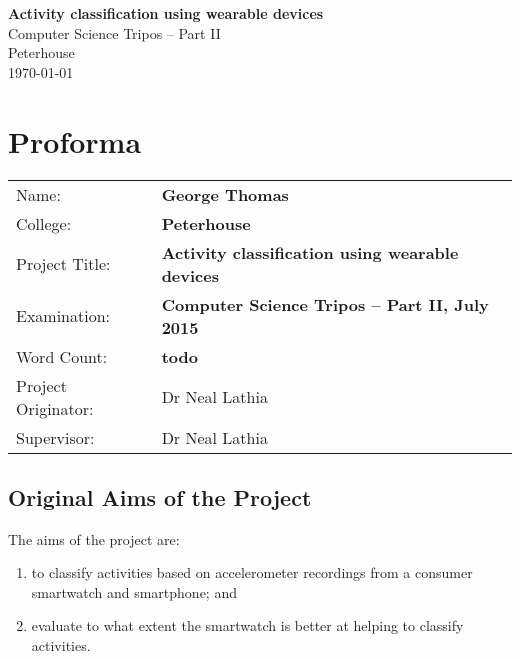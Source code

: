 \documentclass[12pt,a4paper,twoside,openright]{report}
\begin{document}


\pagestyle{empty}


\vspace*{60mm}
\begin{center}
\Huge
\textbf{Activity classification using wearable devices} \\[5mm]
Computer Science Tripos -- Part II \\[5mm]
Peterhouse \\[5mm]
\today  %
\end{center}


\pagestyle{plain}

\chapter*{Proforma}

{\large
\begin{tabular}{ll}
Name:               & \bf George Thomas                       \\
College:            & \bf Peterhouse                     \\
Project Title:      & \bf Activity classification using wearable devices \\
Examination:        & \bf Computer Science Tripos -- Part II, July 2015  \\
Word Count:         & \bf todo \\
Project Originator: & Dr Neal Lathia                    \\
Supervisor:         & Dr Neal Lathia                    \\
\end{tabular}
}


\section*{Original Aims of the Project}

  The aims of the project are:
  \begin{enumerate}
    \item to classify activities based on accelerometer recordings from a consumer smartwatch and smartphone; and
    \item evaluate to what extent the smartwatch is better at helping to classify activities.
  \end{enumerate}
\end{document}
